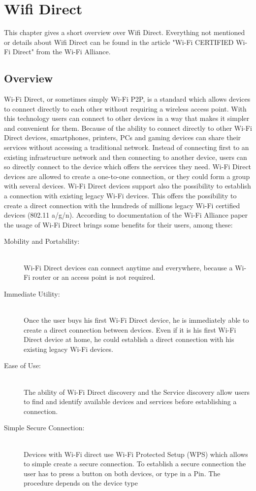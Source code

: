 \chapter{Wifi Direct}
\label{cha:WifiDirect}
This chapter gives a short overview over Wifi Direct. Everything not mentioned or details about Wifi Direct can be found in the article "Wi-Fi CERTIFIED Wi-Fi Direct" from the Wi-Fi Alliance\cite{wifialliance}.

\section{Overview}
\label{sec:Overview}
Wi-Fi Direct, or sometimes simply Wi-Fi P2P, is a standard which allows devices to connect directly to each other without requiring a wireless access point. With this technology users can connect to other devices in a way that makes it simpler and convenient for them. Because of the ability to connect directly to other Wi-Fi Direct devices, smartphones, printers, PCs and gaming devices can share their services without accessing a traditional network. Instead of connecting first to an existing infrastructure network and then connecting to another device, users can so directly connect to the device which offers the services they need. Wi-Fi Direct devices are allowed to create a one-to-one connection, or they could form a group with several devices.
Wi-Fi Direct devices support also the possibility to establish a connection with existing legacy Wi-Fi devices. This offers the possibility to create a direct connection with the hundreds of millions legacy Wi-Fi certified devices (802.11 a/g/n). According to documentation of the Wi-Fi Alliance paper the usage of Wi-Fi Direct brings some benefits for their users, among these:\\
\begin{description}
  \item[Mobility and Portability:] \hfill \\ Wi-Fi Direct devices can connect anytime and everywhere, because a Wi-Fi router or an access point is not required.
  \item[Immediate Utility:] \hfill \\ Once the user buys his first Wi-Fi Direct device, he is immediately able to create a direct connection between devices. Even if it is his first Wi-Fi Direct device at home, he could establish a direct connection with his existing legacy Wi-Fi devices.
  \item[Ease of Use:] \hfill \\ The ability of Wi-Fi Direct discovery and the Service discovery allow users to find and identify available devices and services before establishing a connection.
  \item[Simple Secure Connection:] \hfill \\ Devices with Wi-Fi direct use Wi-Fi Protected Setup (WPS) which allows to simple create a secure connection. To establish a secure connection the user has to press a button on both devices, or type in a Pin. The procedure depends on the device type\\
\end{description}

